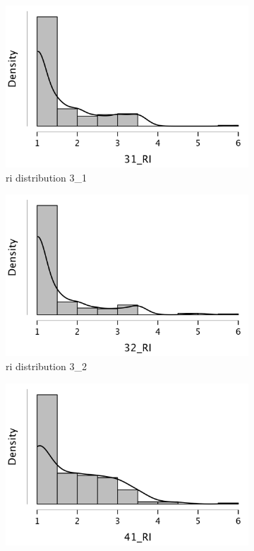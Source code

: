\documentclass[
  a4paper,  %
  twoside,  %
  bibliography=totoc,
  headsepline,
  cleardoublepage=empty,
  parskip=half,
  draft=false
]{scrbook}
\begin{document}
\begin{figure}[h]
\begin{subfigure}{0.3\textwidth}
    \includegraphics[width=\linewidth]{graphics/images/statistics/RIs/31_RI.png}
    \caption{\gls{ri} distribution 3\_1}
    \label{fig:RI31}
  \end{subfigure}
  \begin{subfigure}{0.3\textwidth}
    \includegraphics[width=\linewidth]{graphics/images/statistics/RIs/32_RI.png}
    \caption{\gls{ri} distribution 3\_2}
    \label{fig:RI32}
  \end{subfigure}
  \begin{subfigure}{0.3\textwidth}
    \includegraphics[width=\linewidth]{graphics/images/statistics/RIs/41_RI.png}

\end{subfigure}
\end{figure}
\end{document}
